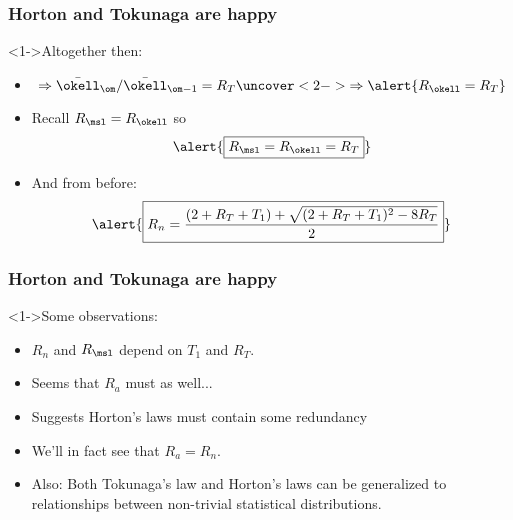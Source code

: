 \begin{frame}[label=]
  \frametitle{Horton and Tokunaga are happy}

  \begin{block}<1->{Altogether then:}
  \begin{itemize}
  \item<1-> 
      $$ \Rightarrow \bar{\okell}_\om/\bar{\okell}_{\om-1} = R_T
      \uncover<2->{
        \Rightarrow \alert{R_\okell = R_T} 
      }
      $$
    \item<3->
      Recall $R_\msl = R_\okell$ so 
      $$ 
      \alert{\boxed{R_\msl = R_\okell =  R_T}}
      $$
    \item<4->
      And from before:
      $$
      \alert{\boxed{
          R_n
          =
          \frac{
            (2+R_T+T_1)
            +
            \sqrt{
              (2+R_T+T_1)^2-8R_T
            }
          }
          {2}
        }
      }
      $$
  \end{itemize}
  \end{block}

\end{frame}


\begin{frame}[label=]
  \frametitle{Horton and Tokunaga are happy}

  \begin{block}<1->{Some observations:}
    \begin{itemize}
    \item<1->
      $R_n$ and $R_\msl$ depend on $T_1$ and $R_T$.
    \item<2->
      Seems that $R_a$ must as well...
    \item<3-> Suggests Horton's laws must contain some redundancy
    \item<4-> We'll in fact see that $R_a = R_n$.
    \item<5-> Also: Both Tokunaga's law and Horton's laws
      can be generalized to relationships between
      non-trivial statistical distributions.\cite{dodds2001b,dodds2001c}
    \end{itemize}
  \end{block}

\end{frame}

